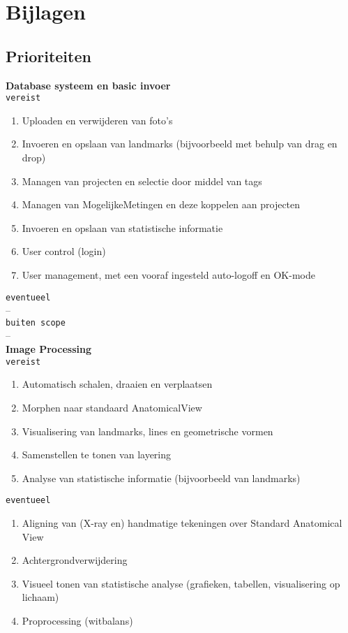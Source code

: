 \section{Bijlagen}
\label{Bijlagen}

\subsection{Prioriteiten}
\Large{\textbf{Database systeem en basic invoer}}
\\\verb!vereist!
\begin{enumerate}
	\item Uploaden en verwijderen van foto's
	\item Invoeren en opslaan van landmarks (bijvoorbeeld met behulp van drag en drop)
	\item Managen van projecten en selectie door middel van tags
	\item Managen van MogelijkeMetingen en deze koppelen aan projecten
	\item Invoeren en opslaan van statistische informatie
	\item User control (login)
	\item User management, met een vooraf ingesteld auto-logoff en OK-mode
\end{enumerate}
\verb!eventueel!
\\
--
\\\verb!buiten scope!\\
--
\\
\Large{\textbf{Image Processing}}
\\\verb!vereist!
\begin{enumerate}
	\item Automatisch schalen, draaien en verplaatsen
	\item Morphen naar standaard AnatomicalView
	\item Visualisering van landmarks, lines en geometrische vormen
	\item Samenstellen te tonen van layering
	\item Analyse van statistische informatie (bijvoorbeeld van landmarks)
\end{enumerate}
\verb!eventueel!
\begin{enumerate}
	\item Aligning van (X-ray en) handmatige tekeningen over Standard Anatomical View
	\item Achtergrondverwijdering
	\item Visueel tonen van statistische analyse (grafieken, tabellen, visualisering op lichaam)
	\item Proprocessing (witbalans)
\end{enumerate}
